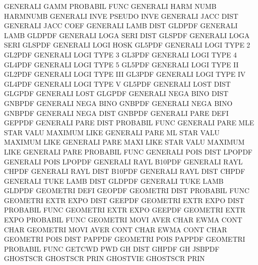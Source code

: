 GENERALI GAMM                           PROBABIL FUNC
GENERALI HARM NUMB                      HARMNUMB
GENERALI INVE                           PSEUDO   INVE
GENERALI JACC DIST                      GENERALI JACC COEF
GENERALI LAMB DIST                      GLDPDF
GENERALI LAMB                           GLDPDF
GENERALI LOGA SERI DIST                 GLSPDF
GENERALI LOGA SERI                      GLSPDF
GENERALI LOGI HOSK                      GL5PDF
GENERALI LOGI TYPE 2                    GL2PDF
GENERALI LOGI TYPE 3                    GL3PDF
GENERALI LOGI TYPE 4                    GL4PDF
GENERALI LOGI TYPE 5                    GL5PDF
GENERALI LOGI TYPE II                   GL2PDF
GENERALI LOGI TYPE III                  GL3PDF
GENERALI LOGI TYPE IV                   GL4PDF
GENERALI LOGI TYPE V                    GL5PDF
GENERALI LOST DIST                      GLGPDF
GENERALI LOST                           GLGPDF
GENERALI NEGA BINO DIST                 GNBPDF
GENERALI NEGA BINO                      GNBPDF
GENERALI NEGA BINO                      GNBPDF
GENERALI NEGA DIST                      GNBPDF
GENERALI PARE DEFI                      GEPPDF
GENERALI PARE DIST                      PROBABIL FUNC
GENERALI PARE MLE  STAR VALU            MAXIMUM  LIKE
GENERALI PARE ML   STAR VALU            MAXIMUM  LIKE
GENERALI PARE MAXI LIKE STAR VALU       MAXIMUM  LIKE
GENERALI PARE                           PROBABIL FUNC
GENERALI POIS DIST                      LPOPDF
GENERALI POIS                           LPOPDF
GENERALI RAYL                           B10PDF
GENERALI RAYL                           CHPDF
GENERALI RAYL DIST                      B10PDF
GENERALI RAYL DIST                      CHPDF
GENERALI TUKE LAMB DIST                 GLDPDF
GENERALI TUKE LAMB                      GLDPDF
GEOMETRI DEFI                           GEOPDF
GEOMETRI DIST                           PROBABIL FUNC
GEOMETRI EXTR EXPO DIST                 GEEPDF
GEOMETRI EXTR EXPO DIST                 PROBABIL FUNC
GEOMETRI EXTR EXPO                      GEEPDF
GEOMETRI EXTR EXPO                      PROBABIL FUNC
GEOMETRI MOVI AVER CHAR                 EWMA     CONT CHAR
GEOMETRI MOVI AVER CONT CHAR            EWMA     CONT CHAR
GEOMETRI POIS DIST                      PAPPDF
GEOMETRI POIS                           PAPPDF
GEOMETRI                                PROBABIL FUNC
GETCWD                                  PWD
GH       DIST                           GHPDF
GH                                      JSBPDF
GHOSTSCR                                GHOSTSCR PRIN
GHOSTVIE                                GHOSTSCR PRIN
